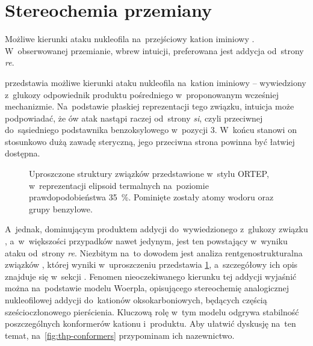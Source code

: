 \section{Stereochemia przemiany}\label{numeric:stereo}

\begin{marginfigure}
  
  \caption{
    Możliwe kierunki ataku nukleofila na~przejściowy kation iminiowy .
    W~obserwowanej przemianie, wbrew intuicji, preferowana jest addycja od~strony \textit{re}.
  }\label{fig:direction}
\end{marginfigure}

 przedstawia możliwe kierunki ataku nukleofila na~kation iminiowy
   \--- wywiedziony z~glukozy odpowiednik produktu pośredniego 
  w~proponowanym wcześniej mechanizmie.
Na~podstawie płaskiej reprezentacji tego związku, intuicja może podpowiadać, że ów atak
  nastąpi raczej od~strony \textit{si}, czyli przeciwnej do~sąsiedniego podstawnika
  benzoksylowego w~pozycji 3.
W~końcu stanowi on stosunkowo dużą zawadę steryczną, jego przeciwna strona powinna być
  łatwiej dostępna.

\begin{figure}
  
  \caption{
    Uproszczone struktury związków  przedstawione
      w~stylu ORTEP, w~reprezentacji elipsoid termalnych na~poziomie prawdopodobieństwa
      \SI{35}{\percent}.
    Pominięte zostały atomy wodoru oraz grupy benzylowe.
  }\label{fig:xray}
\end{figure}

A~jednak, dominującym produktem addycji do~wywiedzionego z~glukozy związku ,
  a~w~większości przypadków nawet jedynym, jest ten powstający w~wyniku ataku od~strony \textit{re}.
Niezbitym na~to dowodem jest analiza rentgenostrukturalna związków
  , której wyniki w~uproszczeniu przedstawia \cref{fig:xray},
  a~szczegółowy ich opis znajduje się w~sekcji .
Fenomen nieoczekiwanego kierunku tej addycji wyjaśnić można na~podstawie modelu Woerpla,
  opisującego stereochemię analogicznej nukleofilowej addycji do~kationów oksokarboniowych,
  będących częścią sześcioczłonowego pierścienia.
Kluczową rolę w~tym modelu odgrywa stabilność poszczególnych konformerów kationu i~produktu.
Aby ułatwić dyskusję na~ten temat,
  na~\cref{fig:thp-conformers} przypominam ich nazewnictwo.

